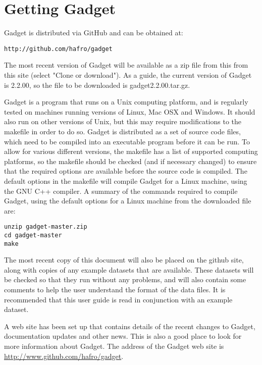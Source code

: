 \documentclass[]{book}
\begin{document}
\hypertarget{sec:gettinggadget}{%
\section{Getting Gadget}\label{sec:gettinggadget}}

Gadget is distributed via GitHub and can be obtained at:

\begin{verbatim}
http://github.com/hafro/gadget
\end{verbatim}

The most recent version of Gadget will be available as a zip file from
this from this site (select "Clone or download"). As a guide, the
current version of Gadget is 2.2.00, so the file to be downloaded is
gadget2.2.00.tar.gz.

Gadget is a program that runs on a Unix computing platform, and is
regularly tested on machines running versions of Linux, Mac OSX and
Windows. It should also run on other versions of Unix, but this may
require modifications to the makefile in order to do so. Gadget is
distributed as a set of source code files, which need to be compiled
into an executable program before it can be run. To allow for various
different versions, the makefile has a list of supported computing
platforms, so the makefile should be checked (and if necessary changed)
to ensure that the required options are available before the source code
is compiled. The default options in the makefile will compile Gadget for
a Linux machine, using the GNU C++ compiler. A summary of the commands
required to compile Gadget, using the default options for a Linux
machine from the downloaded file are:

\begin{verbatim}
unzip gadget-master.zip
cd gadget-master
make
\end{verbatim}

The most recent copy of this document will also be placed on the github
site, along with copies of any example datasets that are available.
These datasets will be checked so that they run without any problems,
and will also contain some comments to help the user understand the
format of the data files. It is recommended that this user guide is read
in conjunction with an example dataset.

A web site has been set up that contains details of the recent changes
to Gadget, documentation updates and other news. This is also a good
place to look for more information about Gadget. The address of the
Gadget web site is \url{http://www.github.com/hafro/gadget}.
\end{document}
